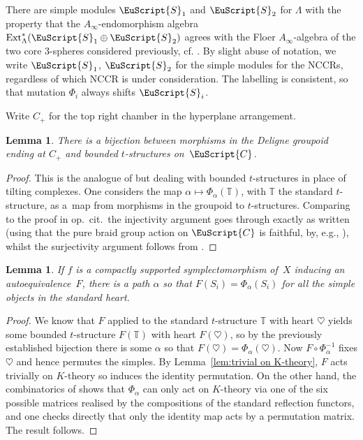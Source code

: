 \documentclass[pdftex]{sigma}
\newcommand{\scrC}{\EuScript{C}}
\def\bT{\mathbb{T}}
\def\A{A}
\def\scrS{\EuScript{S}}
\newtheorem{lem}[thm]{Lemma}
\theoremstyle{definition}
\numberwithin{equation}{section}
\begin{document}
 There are simple modules $\scrS_1$ and $\scrS_2$ for $\Lambda$ with the property that the $\A_{\infty}$-endomorphism algebra $\mathrm{Ext}_{\Lambda}^*(\scrS_1 \oplus \scrS_2)$ agrees with the Floer $A_{\infty}$-algebra of the two core 3-spheres considered previously, cf. \cite[Proposition~3.11]{Smith-Wemyss}.
 By slight abuse of notation, we write $\scrS_1$, $\scrS_2$ for the simple modules for the NCCRs, regardless of which NCCR is under consideration. The labelling is consistent, so that mutation $\Phi_i$ always shifts $\scrS_i$.

Write $C_+$ for the top right chamber in the hyperplane arrangement.

\begin{lem} \label{lem:path bijection}
There is a bijection between morphisms in the Deligne groupoid ending at $C_+$ and bounded $t$-structures on~$\scrC$.
\end{lem}

\begin{proof} This is the analogue of \cite[Corollary 5.3]{August-Wemyss} but dealing with bounded $t$-structures in place of tilting complexes. One considers the map $\alpha \mapsto \Phi_{\alpha}(\bT)$, with $\bT$ the standard $t$-structure, as a~map from morphisms in the groupoid to $t$-structures. Comparing to the proof in op.~cit.\ the injectivity argument goes through exactly as written (using that the pure braid group action on $\scrC$ is faithful, by, e.g., \cite[Corollary~5.5]{August-Wemyss}), whilst the surjectivity argument follows from \cite[Theorem~4.6]{Hara-Wemyss}.
\end{proof}


\begin{lem}\label{lem:same on simples}
If $f$ is a compactly supported symplectomorphism of~$X$ inducing an autoequivalence~$F$, there is a path $\alpha$ so that $F(S_i) = \Phi_{\alpha}(S_i)$ for all the simple objects in the standard heart.
\end{lem}

\begin{proof} We know that $F$ applied to the standard $t$-structure $\bT$ with heart $\heartsuit$ yields some bounded $t$-structure $F(\bT)$ with heart $F(\heartsuit)$, so by the previously established bijection there is some $\alpha$ so that $F(\heartsuit) = \Phi_{\alpha}(\heartsuit)$. Now $F \circ \Phi_{\alpha}^{-1}$ fixes $\heartsuit$ and hence permutes the simples. By Lemma~\ref{lem:trivial on K-theory}, $F$ acts trivially on $K$-theory so induces the identity permutation. On the other hand, the combinatorics of \cite[Proposition 4.8]{Hirano-Wemyss} shows that $\Phi_{\alpha}$ can only act on $K$-theory via one of the six possible matrices realised by the compositions of the standard reflection functors, and one checks directly that only the identity map acts by a permutation matrix. The result follows. \end{proof}
\end{document}
